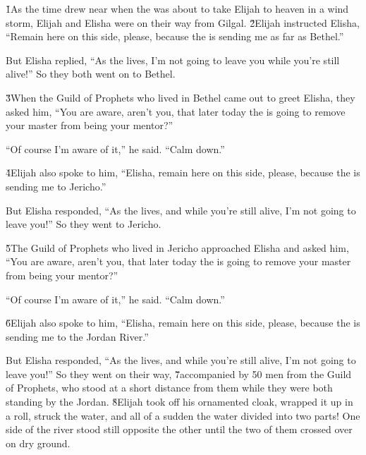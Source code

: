 \v{1}As the time drew near when the  was about to take Elijah to heaven in a wind storm, Elijah and Elisha were on their way from Gilgal. \v{2}Elijah instructed Elisha, ``Remain here on this side, please, because the  is sending me as far as Bethel.''

But Elisha replied, ``As the  lives, I'm not going to leave you while you're still alive!'' So they both went on to Bethel.

\v{3}When the Guild of Prophets who lived in Bethel came out to greet Elisha, they asked him, ``You are aware, aren't you, that later today the  is going to remove your master from being your mentor?''

``Of course I'm aware of it,'' he said. ``Calm down.''

\v{4}Elijah also spoke to him, ``Elisha, remain here on this side, please, because the  is sending me to Jericho.''

But Elisha responded, ``As the  lives, and while you're still alive, I'm not going to leave you!'' So they went to Jericho.

\v{5}The Guild of Prophets who lived in Jericho approached Elisha and asked him, ``You are aware, aren't you, that later today the  is going to remove your master from being your mentor?''

``Of course I'm aware of it,'' he said. ``Calm down.''

\v{6}Elijah also spoke to him, ``Elisha, remain here on this side, please, because the  is sending me to the Jordan River.''

But Elisha responded, ``As the  lives, and while you're still alive, I'm not going to leave you!'' So they went on their way, \v{7}accompanied by 50 men from the Guild of Prophets, who stood at a short distance from them while they were both standing by the Jordan. \v{8}Elijah took off his ornamented cloak, wrapped it up in a roll, struck the water, and all of a sudden the water divided into two parts! One side of the river stood still opposite the other until the two of them crossed over on dry ground.

